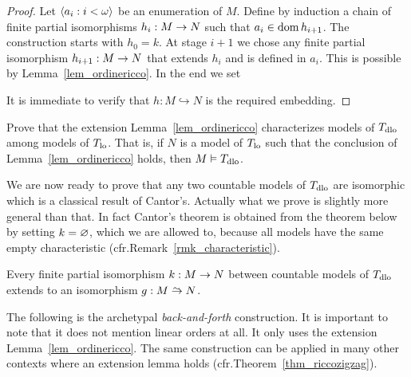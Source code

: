 \documentclass[creche.tex]{subfiles}
\begin{document}
\begin{proof}
Let $\<a_i:i<\omega\>$ be an enumeration of $M$.
Define by induction a chain of finite partial isomorphisms $h_i:M\imp N$ such that $a_i\in\dom h_{i+1}$.
The construction starts with $h_0=k$.
At stage $i+1$ we chose any finite partial isomorphism $h_{i+1}:M\imp N$ that extends $h_i$ and is defined in $a_i$.
This is possible by Lemma~\ref{lem_ordinericco}.
In the end we set


It is immediate to verify that $h:M\hookrightarrow N$ is the required embedding.
\end{proof}


\begin{exercise}\label{ex_ricco->dlo}
Prove that the extension Lemma~\ref{lem_ordinericco} characterizes models of $T_{\rm dlo}$ among models of $T_{\rm lo}$.
That is, if $N$ is a model of $T_{\rm lo}$ such that the conclusion of Lemma~\ref{lem_ordinericco} holds, then $M\models  T_{\rm dlo}$.\QED
\end{exercise}


We are now ready to prove that any two countable models of $T_{\rm dlo}$ are isomorphic which is a classical result of Cantor's.
Actually what we prove is slightly more general than that.
In fact Cantor's theorem is obtained from the theorem below by setting $k=\0$, which we are allowed to, because all models have the same empty characteristic (cfr.\@ Remark~\ref{rmk_characteristic}).

\begin{theorem}\label{thm_zigzagcantor}
Every finite partial isomorphism $k:M\imp N$ between countable models of $T_{\rm dlo}$ extends to an isomorphism $g:M\isomap N$.
\end{theorem}

The following is the archetypal \emph{back-and-forth\/} construction.
It is important to note that it does not mention linear orders at all.
It only uses the extension Lemma~\ref{lem_ordinericco}.
The same construction can be applied in many other contexts where an extension lemma holds (cfr.\@ Theorem~\ref{thm_riccozigzag}).
\end{document}
